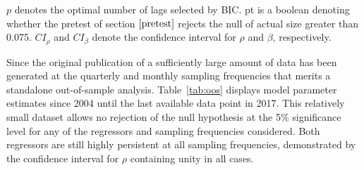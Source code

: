 \documentclass[11pt, a4paper]{article}
\begin{document}
\begin{table}[h!]
\begin{threeparttable}
\begin{tablenotes}
$p$ denotes the optimal number of lags selected by BIC. pt is a boolean denoting whether the pretest of section $\ref{pretest}$ rejects the null of actual size greater than 0.075. $CI_{\rho}$ and $CI_{\beta}$ denote the confidence interval for $\rho$ and $\beta$, respectively.
\end{tablenotes}
\end{threeparttable}
\end{table}

Since the original publication of \citet{campbell2006efficient} a sufficiently large amount of data has been generated at the quarterly and monthly sampling frequencies that merits a standalone out-of-sample analysis. Table~\vref{tab:oos} displays model parameter estimates since 2004 until the last available data point in 2017. This relatively small dataset allows no rejection of the null hypothesis at the 5\% significance level for any of the regressors and sampling frequencies considered. Both regressors are still highly persistent at all sampling frequencies, demonstrated by the confidence interval for $\rho$ containing unity in all cases. 
\end{document}
